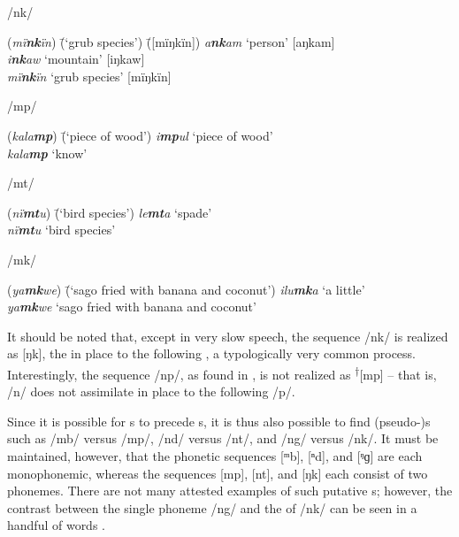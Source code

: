 \ea%
    \label{ex:phon:11}
          /nk/\\
\begin{tabbing}
{(\textit{mï\textbf{nk}ïn})} \= {(‘grub species’)} \= {([mïŋkïn])}\kill
{\textit{a\textbf{nk}am}} \> {‘person’} \> {[aŋkam]}\\
{\textit{i\textbf{nk}aw}} \> {‘mountain’} \> {[iŋkaw]}\\
{\textit{mï\textbf{nk}ïn}} \> {‘grub species’} \> {[mïŋkïn]}
\end{tabbing}
 \z

\ea%
    \label{ex:phon:12}
          /mp/\\
\begin{tabbing}
{(\textit{kala\textbf{mp}})} \= {(‘piece of wood’)}\kill
{\textit{i\textbf{mp}ul}} \> {‘piece of wood’}\\
{\textit{kala\textbf{mp}}} \> {‘know’}\footnotemark
\end{tabbing}
\z
{}

\ea%
    \label{ex:phon:13}
          /mt/\\
\begin{tabbing}
{(\textit{nï\textbf{mt}u})} \= {(‘bird species’)}\kill
{\textit{le\textbf{mt}a}} \> {‘spade’}\\
{\textit{nï\textbf{mt}u}} \> {‘bird species’}
\end{tabbing}
\z

\ea%
    \label{ex:phon:14}
          /mk/\\
\begin{tabbing}
{(\textit{ya\textbf{mk}we})} \= {(‘sago fried with banana and coconut’)}\kill
{\textit{ilu\textbf{mk}a}} \> {‘a little’}\\
{\textit{ya\textbf{mk}we}} \> {‘sago fried with banana and coconut’}
\end{tabbing}
\z

It should be noted that, except in very slow speech, the sequence /nk/ is realized as [ŋk], the   in place to the following  , a typologically very common process. Interestingly, the sequence /np/, as found in , is not realized as \textsuperscript{†}[mp] -- that is, /n/ does not  assimilate in place to the following   /p/.

  Since it is possible for  s to precede  s, it is thus also possible to find (pseudo-)s such as /mb/ versus /mp/, /nd/ versus /nt/, and /ng/ versus /nk/. It must be maintained, however, that the phonetic sequences [ᵐb], [ⁿd], and [ᵑɡ] are each monophonemic, whereas the sequences [mp], [nt], and [ŋk] each consist of two phonemes. There are not many attested examples of such putative s; however, the contrast between the single phoneme /ng/ and the  of /nk/ can be seen in a handful of words .

